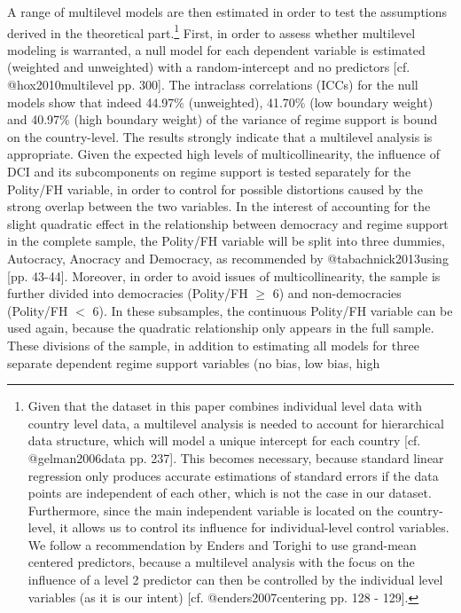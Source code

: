 \documentclass[]{article}
\let\rmarkdownfootnote\footnote%
\def\footnote{\protect\rmarkdownfootnote}
\begin{document}
A range of multilevel models are then estimated in order to test the
assumptions derived in the theoretical part.\footnote{Given that the
  dataset in this paper combines individual level data with country
  level data, a multilevel analysis is needed to account for
  hierarchical data structure, which will model a unique intercept for
  each country {[}cf. @gelman2006data pp. 237{]}. This becomes
  necessary, because standard linear regression only produces accurate
  estimations of standard errors if the data points are independent of
  each other, which is not the case in our dataset. Furthermore, since
  the main independent variable is located on the country-level, it
  allows us to control its influence for individual-level control
  variables. We follow a recommendation by Enders and Torighi to use
  grand-mean centered predictors, because a multilevel analysis with the
  focus on the influence of a level 2 predictor can then be controlled
  by the individual level variables (as it is our intent) {[}cf.
  @enders2007centering pp. 128 - 129{]}.} First, in order to assess
whether multilevel modeling is warranted, a null model for each
dependent variable is estimated (weighted and unweighted) with a
random-intercept and no predictors {[}cf. @hox2010multilevel pp. 300{]}.
The intraclass correlations (ICCs) for the null models show that indeed
44.97\% (unweighted), 41.70\% (low boundary weight) and 40.97\% (high
boundary weight) of the variance of regime support is bound on the
country-level. The results strongly indicate that a multilevel analysis
is appropriate. Given the expected high levels of multicollinearity, the
influence of DCI and its subcomponents on regime support is tested
separately for the Polity/FH variable, in order to control for possible
distortions caused by the strong overlap between the two variables. In
the interest of accounting for the slight quadratic effect in the
relationship between democracy and regime support in the complete
sample, the Polity/FH variable will be split into three dummies,
Autocracy, Anocracy and Democracy, as recommended by
@tabachnick2013using {[}pp. 43-44{]}. Moreover, in order to avoid issues
of multicollinearity, the sample is further divided into democracies
(Polity/FH \(\ge\) 6) and non-democracies (Polity/FH \(<\) 6). In these
subsamples, the continuous Polity/FH variable can be used again, because
the quadratic relationship only appears in the full sample. These
divisions of the sample, in addition to estimating all models for three
separate dependent regime support variables (no bias, low bias, high
\end{document}
